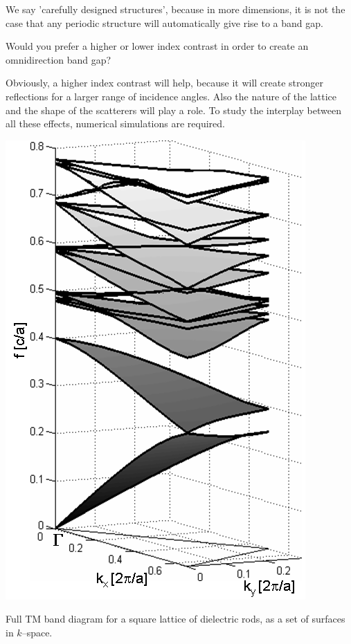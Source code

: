 We say 'carefully designed structures', because in more dimensions, it is not the case that any periodic structure will automatically give rise to a band gap.

\begin{cue}
Would you prefer a higher or lower index contrast in order to create an omnidirection band gap?
\end{cue}

Obviously, a higher index contrast will help, because it will create stronger reflections for a larger range of incidence angles. Also the nature of the lattice and the shape of the scatterers will play a role. To study the interplay between all these effects, numerical simulations are required.

\begin{marginfigure}[-1.5cm]
\centering
\includegraphics{symmetry/figures/3d_bands}
\caption{Full TM band diagram for a square lattice of dielectric rods, as a set of surfaces in $k$--space.}
\label{fig-bands-rods-3D}
\end{marginfigure}

